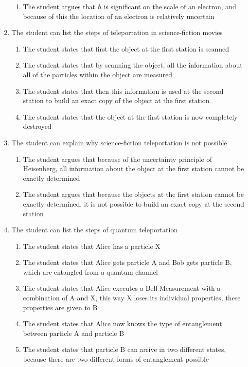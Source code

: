 \documentclass[11pt,twoside]{report} %
\begin{document}
\begin{enumerate}
\begin{enumerate}
\item The student argues that $\hbar$ is significant on the scale of an electron, and because of this the location of an electron is relatively uncertain
\end{enumerate}
\item The student can list the steps of teleportation in science-fiction movies
\begin{enumerate}
\item The student states that first the object at the first station is scanned
\item The student states that by scanning the object, all the information about all of the particles within the object are measured
\item The student states that then this information is used at the second station to build an exact copy of the object at the first station
\item The student states that the object at the first station is now completely destroyed
\end{enumerate}
\item The student can explain why science-fiction teleportation is not possible
\begin{enumerate}
\item The student argues that because of the uncertainty principle of Heisenberg, all information about the object at the first station cannot be exactly determined
\item The student argues that because the objects at the first station cannot be exactly determined, it is not possible to build an exact copy at the second station
\end{enumerate}
\item The student can list the steps of quantum teleportation
\begin{enumerate}
\item The student states that Alice has a particle X
\item The student states that Alice gets particle A and Bob gets particle B, which are entangled from a quantum channel
\item The student states that Alice executes a Bell Measurement with a combination of A and X, this way X loses its individual properties, these properties are given to B
\item The student states that Alice now knows the type of entanglement between particle A and particle B
\item The student states that particle B can arrive in two different states, because there are two different forms of entanglement possible

\end{enumerate}
\end{enumerate}
\end{document}

